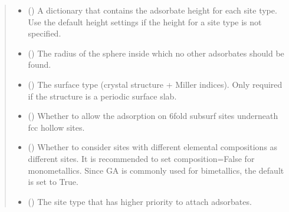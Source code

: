 \documentclass[letterpaper,10pt,english]{sphinxmanual}
\begin{document}
\begin{fulllineitems}
\begin{quote}
\begin{description}
\begin{itemize}
\item {} 
 (\sphinxstyleliteralemphasis{\sphinxupquote{, }}) \textendash{} A dictionary that contains the adsorbate height for each site
type. Use the default height settings if the height for a site
type is not specified.

\item {} 
 (\sphinxstyleliteralemphasis{\sphinxupquote{, }}) \textendash{} The radius of the sphere inside which no other adsorbates
should be found.

\item {} 
 (\sphinxstyleliteralemphasis{\sphinxupquote{, }}) \textendash{} The surface type (crystal structure + Miller indices).
Only required if the structure is a periodic surface slab.

\item {} 
 (\sphinxstyleliteralemphasis{\sphinxupquote{, }}) \textendash{} Whether to allow the adsorption on 6\sphinxhyphen{}fold subsurf sites
underneath fcc hollow sites.

\item {} 
 (\sphinxstyleliteralemphasis{\sphinxupquote{, }}) \textendash{} Whether to consider sites with different elemental compositions
as different sites. It is recommended to set composition=False
for monometallics. Since GA is commonly used for bimetallics,
the default is set to True.

\item {} 
 (\sphinxstyleliteralemphasis{\sphinxupquote{, }}) \textendash{} The site type that has higher priority to attach adsorbates.


\end{itemize}
\end{description}
\end{quote}
\end{fulllineitems}
\end{document}
